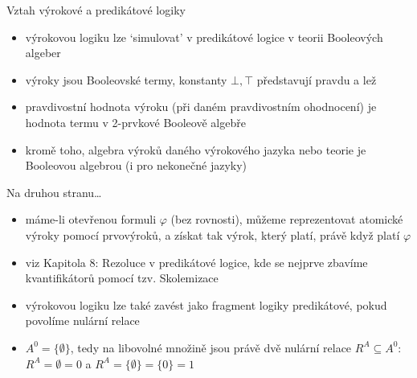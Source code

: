 \documentclass{beamer}
\begin{document}
\begin{frame}{Vztah výrokové a predikátové logiky}
   
    \begin{itemize}
        \item výrokovou logiku lze `simulovat' v predikátové logice v teorii Booleových algeber
        \item výroky jsou \alert{Booleovské termy}, konstanty $\bot,\top$ představují pravdu a lež
        \item pravdivostní hodnota výroku (při daném pravdivostním ohodnocení) je hodnota termu v 2-prvkové Booleově algebře
        \item kromě toho, \alert{algebra výroků} daného výrokového jazyka nebo teorie je Booleovou algebrou (i pro nekonečné jazyky)        
    \end{itemize}
    
\end{frame}

\begin{frame}{Na druhou stranu\dots}

    \begin{itemize}
        \item máme-li \alert{otevřenou} formuli $\varphi$ (bez rovnosti), můžeme reprezentovat atomické výroky pomocí prvovýroků, a získat tak výrok, který platí, právě když platí $\varphi$
        \item viz Kapitola 8: Rezoluce v predikátové logice, kde se nejprve zbavíme kvantifikátorů pomocí tzv. \alert{Skolemizace}
        \item výrokovou logiku lze také zavést jako fragment logiky predikátové, pokud povolíme \alert{nulární relace}
        \item $A^0=\{\emptyset\}$, tedy na libovolné množině jsou právě dvě nulární relace $R^A\subseteq A^0$: $R^A=\emptyset=0$ a $R^A=\{\emptyset\}=\{0\}=1$
    \end{itemize}

    
        
\end{frame}
\end{document}
